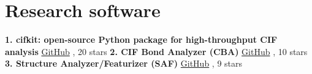 \documentclass{article}%
\begin{document}
\section*{Research software}%
\label{sec:Researchsoftware}%
\textbf{1. cifkit: open{-}source Python package for high{-}throughput CIF analysis}%
\newline%
%
\href{https://github.com/bobleesj/cifkit}{GitHub}%
, 20 stars%
\newline%
\newline%
%
\textbf{2. CIF Bond Analyzer (CBA)}%
\newline%
%
\href{https://github.com/bobleesj/cif-bond-analyzer}{GitHub}%
, 10 stars%
\newline%
\newline%
%
\textbf{3. Structure Analyzer/Featurizer (SAF)}%
\newline%
%
\href{https://github.com/bobleesj/structure-analyzer-featurizer}{GitHub}%
, 9 stars%

%
\end{document}
